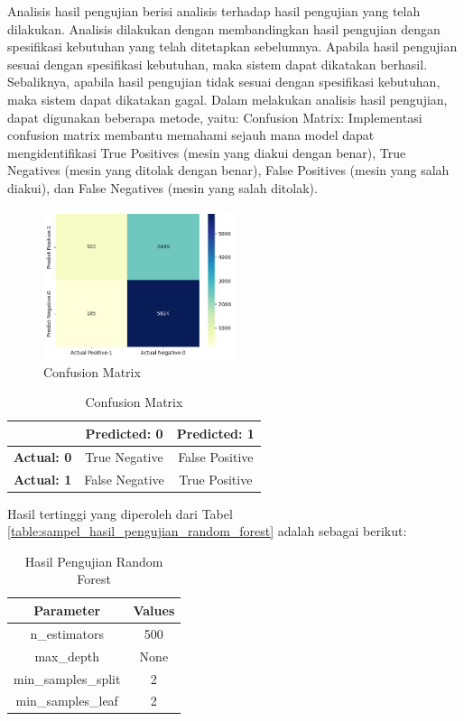 Analisis hasil pengujian berisi analisis terhadap hasil pengujian yang telah dilakukan. Analisis dilakukan dengan membandingkan hasil pengujian dengan spesifikasi kebutuhan yang telah ditetapkan sebelumnya. Apabila hasil pengujian sesuai dengan spesifikasi kebutuhan, maka sistem dapat dikatakan berhasil. Sebaliknya, apabila hasil pengujian tidak sesuai dengan spesifikasi kebutuhan, maka sistem dapat dikatakan gagal.
Dalam melakukan analisis hasil pengujian, dapat digunakan beberapa metode, yaitu:
Confusion Matrix: Implementasi confusion matrix membantu memahami sejauh mana model dapat mengidentifikasi True Positives (mesin yang diakui dengan benar), True Negatives (mesin yang ditolak dengan benar), False Positives (mesin yang salah diakui), dan False Negatives (mesin yang salah ditolak).

\begin{figure}
	\centering
	\includegraphics[width=0.5\textwidth]{BAB_TESIS/IMAGES/confusion_matrix.png}
	\caption{Confusion Matrix}
	\label{fig:confusion_matrix}
\end{figure}

\begin{table}[H]
	\caption{Confusion Matrix}
	\centering
	\begin{tabular}{|c|c|c|}
		\hline
		& \textbf{Predicted: 0} & \textbf{Predicted: 1} \\
		\hline
		\textbf{Actual: 0} & True Negative & False Positive \\
		\hline
		\textbf{Actual: 1} & False Negative & True Positive \\
		\hline
	\end{tabular}
	\label{table:1}
\end{table}

Hasil tertinggi yang diperoleh dari Tabel \ref{table:sampel_hasil_pengujian_random_forest} adalah sebagai berikut:

\begin{table}[H]
	\caption{Hasil Pengujian Random Forest}
	\centering
	\begin{tabular}{|c|c|}
		\hline
		\textbf{Parameter} & \textbf{Values} \\
		\hline
		n\_estimators & 500 \\
		\hline
		max\_depth & None \\
		\hline
		min\_samples\_split & 2 \\
		\hline
		min\_samples\_leaf & 2 \\
		\hline
	\end{tabular}
	\label{table:hasil_rf}
\end{table}

